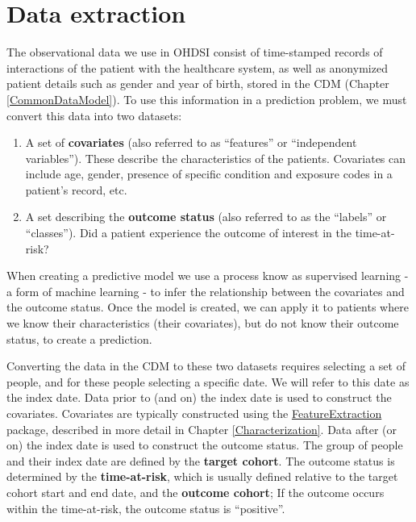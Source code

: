\documentclass[11pt]{book}
\providecommand{\tightlist}{%
  \setlength{\itemsep}{0pt}\setlength{\parskip}{0pt}}
\theoremstyle{definition}
\theoremstyle{definition}
\theoremstyle{definition}
\theoremstyle{remark}
\begin{document}
\hypertarget{data-extraction-2}{%
\section{Data extraction}\label{data-extraction-2}}

The observational data we use in OHDSI consist of time-stamped records of interactions of the patient with the healthcare system, as well as anonymized patient details such as gender and year of birth, stored in the CDM (Chapter \ref{CommonDataModel}). To use this information in a prediction problem, we must convert this data into two datasets:

\begin{enumerate}
\def\labelenumi{\arabic{enumi}.}
\tightlist
\item
  A set of \textbf{covariates} (also referred to as ``features'' or ``independent variables''). These describe the characteristics of the patients. Covariates can include age, gender, presence of specific condition and exposure codes in a patient's record, etc.
\item
  A set describing the \textbf{outcome status} (also referred to as the ``labels'' or ``classes''). Did a patient experience the outcome of interest in the time-at-risk?
\end{enumerate}

When creating a predictive model we use a process know as supervised learning - a form of machine learning - to infer the relationship between the covariates and the outcome status. Once the model is created, we can apply it to patients where we know their characteristics (their covariates), but do not know their outcome status, to create a prediction.

Converting the data in the CDM to these two datasets requires selecting a set of people, and for these people selecting a specific date. We will refer to this date as the index date. Data prior to (and on) the index date is used to construct the covariates. Covariates are typically constructed using the \href{https://ohdsi.github.io/FeatureExtraction/}{FeatureExtraction} package, described in more detail in Chapter \ref{Characterization}. Data after (or on) the index date is used to construct the outcome status. The group of people and their index date are defined by the \textbf{target cohort}. The outcome status is determined by the \textbf{time-at-risk}, which is usually defined relative to the target cohort start and end date, and the \textbf{outcome cohort}; If the outcome occurs within the time-at-risk, the outcome status is ``positive''.
\end{document}
